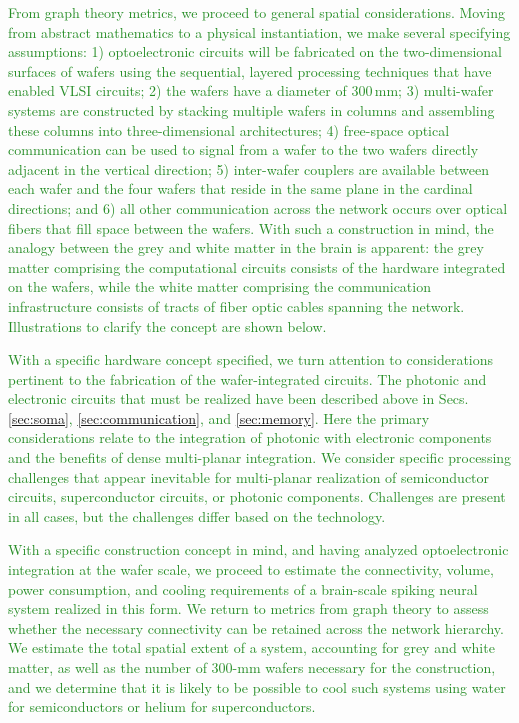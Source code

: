 \documentclass[twocolumn]{article}
\begin{document}
\textcolor{ForestGreen}{From graph theory metrics, we proceed to general spatial considerations. Moving from abstract mathematics to a physical instantiation, we make several specifying assumptions: 1) optoelectronic circuits will be fabricated on the two-dimensional surfaces of wafers using the sequential, layered processing techniques that have enabled VLSI circuits; 2) the wafers have a diameter of 300\,mm; 3) multi-wafer systems are constructed by stacking multiple wafers in columns and assembling these columns into three-dimensional architectures; 4) free-space optical communication can be used to signal from a wafer to the two wafers directly adjacent in the vertical direction; 5) inter-wafer couplers are available between each wafer and the four wafers that reside in the same plane in the cardinal directions; and 6) all other communication across the network occurs over optical fibers that fill space between the wafers. With such a construction in mind, the analogy between the grey and white matter in the brain is apparent: the grey matter comprising the computational circuits consists of the hardware integrated on the wafers, while the white matter comprising the communication infrastructure consists of tracts of fiber optic cables spanning the network. Illustrations to clarify the concept are shown below.}

\textcolor{ForestGreen}{With a specific hardware concept specified, we turn attention to considerations pertinent to the fabrication of the wafer-integrated circuits. The photonic and electronic circuits that must be realized have been described above in Secs. \ref{sec:soma}, \ref{sec:communication}, and \ref{sec:memory}. Here the primary considerations relate to the integration of photonic with electronic components and the benefits of dense multi-planar integration. We consider specific processing challenges that appear inevitable for multi-planar realization of semiconductor circuits, superconductor circuits, or photonic components. Challenges are present in all cases, but the challenges differ based on the technology.}

\textcolor{ForestGreen}{With a specific construction concept in mind, and having analyzed optoelectronic integration at the wafer scale, we proceed to estimate the connectivity, volume, power consumption, and cooling requirements of a brain-scale spiking neural system realized in this form. We return to metrics from graph theory to assess whether the necessary connectivity can be retained across the network hierarchy. We estimate the total spatial extent of a system, accounting for grey and white matter, as well as the number of 300-mm wafers necessary for the construction, and we determine that it is likely to be possible to cool such systems using water for semiconductors or helium for superconductors.}
\end{document}
